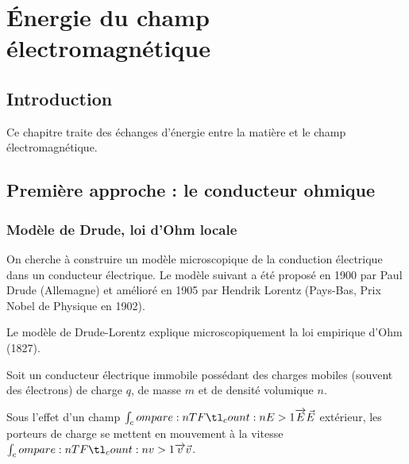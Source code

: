 \chapter{Énergie du champ électromagnétique}

\minitoc

\section*{Introduction}

Ce chapitre traite des échanges d'énergie entre la matière et le champ électromagnétique.

\section{Première approche : le conducteur ohmique}

\subsection{Modèle de Drude, loi d'Ohm locale}

On cherche à construire un modèle microscopique de la conduction électrique dans un conducteur électrique. Le modèle suivant a été proposé en 1900 par Paul Drude (Allemagne) et amélioré en 1905 par Hendrik Lorentz (Pays-Bas, Prix Nobel de Physique en 1902).

Le modèle de Drude-Lorentz explique microscopiquement la loi empirique d'Ohm (1827).

Soit un conducteur électrique immobile possédant des charges mobiles (souvent des électrons) de charge \(q\), de masse \(m\) et de densité volumique \(n\).

Sous l'effet d'un champ \(\v{E}\) extérieur, les porteurs de charge se mettent en mouvement à la vitesse \(\v{v}\).

\begin{center}
\end{center}

